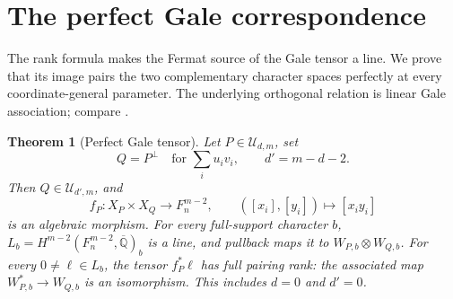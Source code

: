 \documentclass[11pt]{article}
\newcommand{\Q}{\mathbb Q}
\newcommand{\kk}{\overline{\Q}}
\newcommand{\U}{\mathcal U}
\theoremstyle{plain}
\newtheorem{theorem}{Theorem}[section]
\theoremstyle{definition}
\theoremstyle{remark}
\numberwithin{equation}{section}
\begin{document}
\section{The perfect Gale correspondence}\label{sec:gale}
The rank formula makes the Fermat source of the Gale tensor a line.
We prove that its image pairs the two complementary character spaces
perfectly at every coordinate-general parameter.
The underlying orthogonal relation is linear Gale association;
compare \cite[preprint, Definition~1.1 and Proposition~2.2]{EP}.

\begin{theorem}[Perfect Gale tensor]\label{thm:gale}
Let \(P\in\U_{d,m}\), set
\[
 Q=P^\perp\quad\text{for }\sum_i u_i v_i,\qquad d'=m-d-2.
\]
Then \(Q\in\U_{d',m}\), and
\[
 f_P:X_P\times X_Q\longrightarrow F_n^{m-2},\qquad
 ([x_i],[y_i])\longmapsto[x_i y_i]
\]
is an algebraic morphism.  For every full-support character \(b\),
\(L_b=H^{m-2}(F_n^{m-2},\kk)_b\) is a line, and pullback maps it
to \(W_{P,b}\otimes W_{Q,b}\).  For every \(0\ne\ell\in L_b\), the
tensor \(f_P^*\ell\) has full pairing rank: the associated map
\(W_{P,b}^*\to W_{Q,b}\) is an isomorphism.  This includes \(d=0\)
and \(d'=0\).
\end{theorem}
\end{document}
